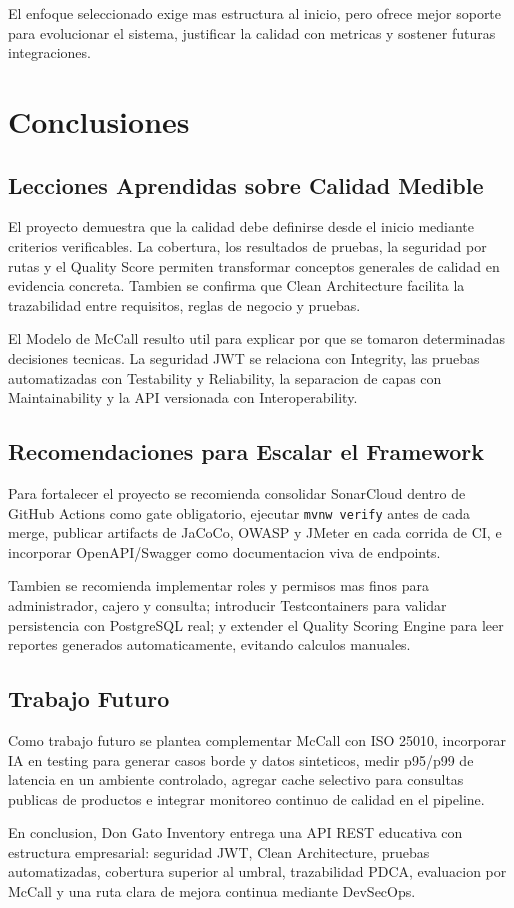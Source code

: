 \documentclass[11pt,oneside]{article}
\begin{document}
El enfoque seleccionado exige mas estructura al inicio, pero ofrece mejor soporte para evolucionar el sistema, justificar la calidad con metricas y sostener futuras integraciones.

\section{Conclusiones}

\subsection{Lecciones Aprendidas sobre Calidad Medible}

El proyecto demuestra que la calidad debe definirse desde el inicio mediante criterios verificables. La cobertura, los resultados de pruebas, la seguridad por rutas y el Quality Score permiten transformar conceptos generales de calidad en evidencia concreta. Tambien se confirma que Clean Architecture facilita la trazabilidad entre requisitos, reglas de negocio y pruebas.

El Modelo de McCall resulto util para explicar por que se tomaron determinadas decisiones tecnicas. La seguridad JWT se relaciona con Integrity, las pruebas automatizadas con Testability y Reliability, la separacion de capas con Maintainability y la API versionada con Interoperability.

\subsection{Recomendaciones para Escalar el Framework}

Para fortalecer el proyecto se recomienda consolidar SonarCloud dentro de GitHub Actions como gate obligatorio, ejecutar \texttt{mvnw verify} antes de cada merge, publicar artifacts de JaCoCo, OWASP y JMeter en cada corrida de CI, e incorporar OpenAPI/Swagger como documentacion viva de endpoints.

Tambien se recomienda implementar roles y permisos mas finos para administrador, cajero y consulta; introducir Testcontainers para validar persistencia con PostgreSQL real; y extender el Quality Scoring Engine para leer reportes generados automaticamente, evitando calculos manuales.

\subsection{Trabajo Futuro}

Como trabajo futuro se plantea complementar McCall con ISO 25010, incorporar IA en testing para generar casos borde y datos sinteticos, medir p95/p99 de latencia en un ambiente controlado, agregar cache selectivo para consultas publicas de productos e integrar monitoreo continuo de calidad en el pipeline.

En conclusion, Don Gato Inventory entrega una API REST educativa con estructura empresarial: seguridad JWT, Clean Architecture, pruebas automatizadas, cobertura superior al umbral, trazabilidad PDCA, evaluacion por McCall y una ruta clara de mejora continua mediante DevSecOps.
\end{document}
